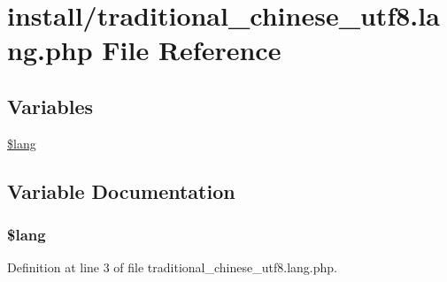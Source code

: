 \hypertarget{install_2traditional__chinese__utf8_8lang_8php}{\section{install/traditional\+\_\+chinese\+\_\+utf8.lang.\+php File Reference}
\label{install_2traditional__chinese__utf8_8lang_8php}
}
\subsection*{Variables}
\begin{DoxyCompactItemize}
\item 
\hyperlink{install_2traditional__chinese__utf8_8lang_8php_a7714b111b644017933931ec69a154102}{\$lang}
\end{DoxyCompactItemize}


\subsection{Variable Documentation}
\hypertarget{install_2traditional__chinese__utf8_8lang_8php_a7714b111b644017933931ec69a154102}{
\subsubsection[{\$lang}]{\setlength{\rightskip}{0pt plus 5cm}\$lang}}\label{install_2traditional__chinese__utf8_8lang_8php_a7714b111b644017933931ec69a154102}


Definition at line 3 of file traditional\+\_\+chinese\+\_\+utf8.\+lang.\+php.

